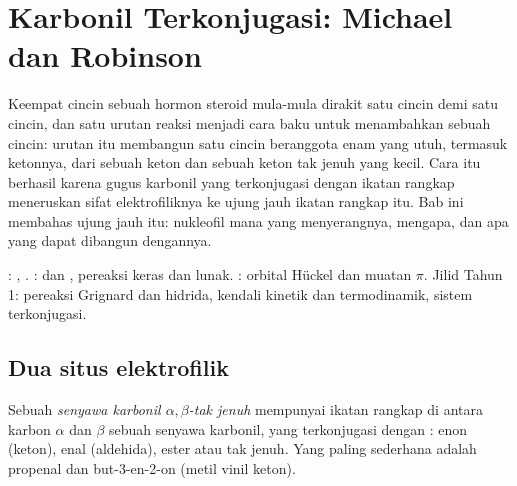 \chapter{Karbonil Terkonjugasi: Michael dan Robinson}\label{ch:b2:conjugate-additions}

Keempat cincin sebuah hormon steroid mula-mula dirakit satu cincin demi satu
cincin, dan satu urutan reaksi menjadi cara baku untuk menambahkan sebuah
cincin: urutan itu membangun satu cincin beranggota enam yang utuh, termasuk
ketonnya, dari sebuah keton dan sebuah keton tak jenuh yang kecil. Cara itu
berhasil karena gugus karbonil yang terkonjugasi dengan ikatan rangkap
 meneruskan sifat elektrofiliknya ke ujung jauh ikatan rangkap itu.
Bab ini membahas ujung jauh itu: nukleofil mana yang menyerangnya, mengapa,
dan apa yang dapat dibangun dengannya.

\begin{recall}
: , . :
 dan , pereaksi keras dan lunak.
: orbital Hückel dan muatan $\pi$. Jilid Tahun 1: pereaksi
Grignard dan hidrida, kendali kinetik dan termodinamik, sistem terkonjugasi.
\end{recall}

\section{Dua situs elektrofilik}

\begin{definition}\label{def:b2:conjugate-additions:enone}
Sebuah \emph{senyawa karbonil $\alpha,\beta$-tak jenuh}
mempunyai ikatan rangkap  di antara karbon $\alpha$
dan $\beta$ sebuah senyawa karbonil, yang terkonjugasi dengan :
enon (keton), enal (aldehida), ester atau  tak jenuh. Yang paling
sederhana adalah propenal  dan but-3-en-2-on 
(metil vinil keton).
\end{definition}

